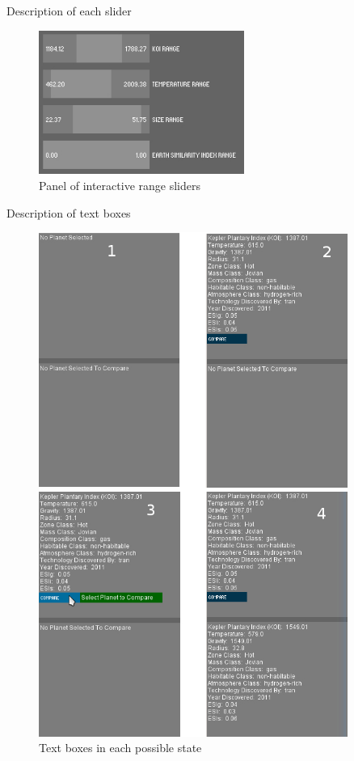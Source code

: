Description of each slider
\begin{figure}[h!]
  \centering
      \includegraphics[width=0.6\textwidth]{images/sliders.jpg}
  \caption{Panel of interactive range sliders}
  \label{fig:sliders}
\end{figure}
Description of text boxes
\begin{figure}[h!]
  \centering
      \includegraphics[width=0.9\textwidth]{images/textBoxes.jpg}
  \caption{Text boxes in each possible state}
  \label{fig:sliders}
\end{figure}
